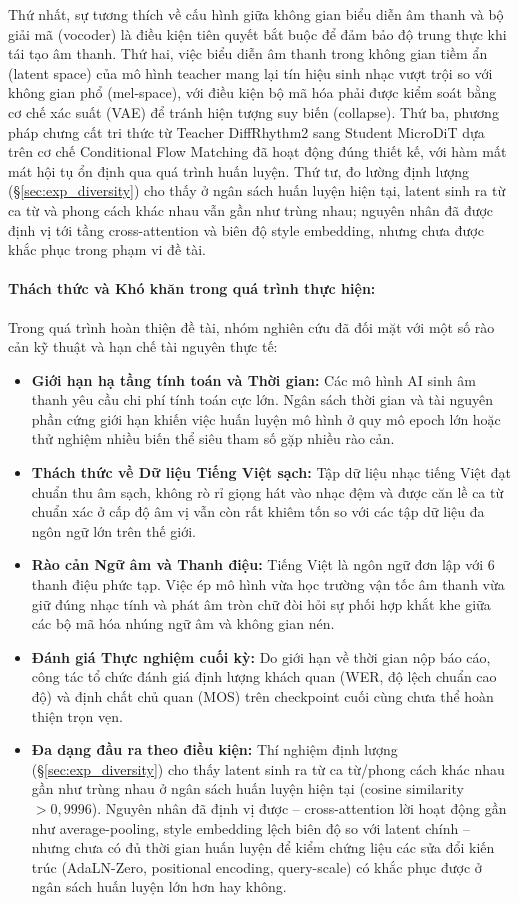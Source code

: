 \documentclass[a4paper,13pt,oneside]{report}
\begin{document}
Thứ nhất, sự tương thích về cấu hình giữa không gian biểu diễn âm thanh và bộ giải mã (vocoder) là điều kiện tiên quyết bắt buộc để đảm bảo độ trung thực khi tái tạo âm thanh. Thứ hai, việc biểu diễn âm thanh trong không gian tiềm ẩn (latent space) của mô hình teacher mang lại tín hiệu sinh nhạc vượt trội so với không gian phổ (mel-space), với điều kiện bộ mã hóa phải được kiểm soát bằng cơ chế xác suất (VAE) để tránh hiện tượng suy biến (collapse). Thứ ba, phương pháp chưng cất tri thức từ Teacher DiffRhythm2 sang Student MicroDiT dựa trên cơ chế Conditional Flow Matching đã hoạt động đúng thiết kế, với hàm mất mát hội tụ ổn định qua quá trình huấn luyện. Thứ tư, đo lường định lượng (\S\ref{sec:exp_diversity}) cho thấy ở ngân sách huấn luyện hiện tại, latent sinh ra từ ca từ và phong cách khác nhau vẫn gần như trùng nhau; nguyên nhân đã được định vị tới tầng cross-attention và biên độ style embedding, nhưng chưa được khắc phục trong phạm vi đề tài.

\paragraph{Thách thức và Khó khăn trong quá trình thực hiện:}
Trong quá trình hoàn thiện đề tài, nhóm nghiên cứu đã đối mặt với một số rào cản kỹ thuật và hạn chế tài nguyên thực tế:
\begin{itemize}
    \item \textbf{Giới hạn hạ tầng tính toán và Thời gian:} Các mô hình AI sinh âm thanh yêu cầu chi phí tính toán cực lớn. Ngân sách thời gian và tài nguyên phần cứng giới hạn khiến việc huấn luyện mô hình ở quy mô epoch lớn hoặc thử nghiệm nhiều biến thể siêu tham số gặp nhiều rào cản.
    \item \textbf{Thách thức về Dữ liệu Tiếng Việt sạch:} Tập dữ liệu nhạc tiếng Việt đạt chuẩn thu âm sạch, không rò rỉ giọng hát vào nhạc đệm và được căn lề ca từ chuẩn xác ở cấp độ âm vị vẫn còn rất khiêm tốn so với các tập dữ liệu đa ngôn ngữ lớn trên thế giới.
    \item \textbf{Rào cản Ngữ âm và Thanh điệu:} Tiếng Việt là ngôn ngữ đơn lập với $6$ thanh điệu phức tạp. Việc ép mô hình vừa học trường vận tốc âm thanh vừa giữ đúng nhạc tính và phát âm tròn chữ đòi hỏi sự phối hợp khắt khe giữa các bộ mã hóa nhúng ngữ âm và không gian nén.
    \item \textbf{Đánh giá Thực nghiệm cuối kỳ:} Do giới hạn về thời gian nộp báo cáo, công tác tổ chức đánh giá định lượng khách quan (WER, độ lệch chuẩn cao độ) và định chất chủ quan (MOS) trên checkpoint cuối cùng chưa thể hoàn thiện trọn vẹn.
    \item \textbf{Đa dạng đầu ra theo điều kiện:} Thí nghiệm định lượng (\S\ref{sec:exp_diversity}) cho thấy latent sinh ra từ ca từ/phong cách khác nhau gần như trùng nhau ở ngân sách huấn luyện hiện tại (cosine similarity $>0{,}9996$). Nguyên nhân đã định vị được -- cross-attention lời hoạt động gần như average-pooling, style embedding lệch biên độ so với latent chính -- nhưng chưa có đủ thời gian huấn luyện để kiểm chứng liệu các sửa đổi kiến trúc (AdaLN-Zero, positional encoding, query-scale) có khắc phục được ở ngân sách huấn luyện lớn hơn hay không.
\end{itemize}
\end{document}
